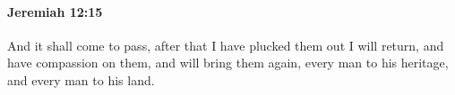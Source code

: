 
		\paragraph{Jeremiah 12:15} %
			\label{JEREMIAH-12-15}

			And it shall come to pass, after that I have plucked them out I will return, and have compassion on them, and will bring them again, every man to his heritage, and every man to his land.


